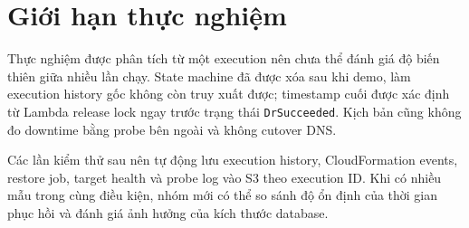 \section{Giới hạn thực nghiệm}

Thực nghiệm được phân tích từ một execution nên chưa thể đánh giá độ biến thiên giữa nhiều lần chạy. State machine đã được xóa sau khi demo, làm execution history gốc không còn truy xuất được; timestamp cuối được xác định từ Lambda release lock ngay trước trạng thái \texttt{DrSucceeded}. Kịch bản cũng không đo downtime bằng probe bên ngoài và không cutover DNS.

Các lần kiểm thử sau nên tự động lưu execution history, CloudFormation events, restore job, target health và probe log vào S3 theo execution ID. Khi có nhiều mẫu trong cùng điều kiện, nhóm mới có thể so sánh độ ổn định của thời gian phục hồi và đánh giá ảnh hưởng của kích thước database.
